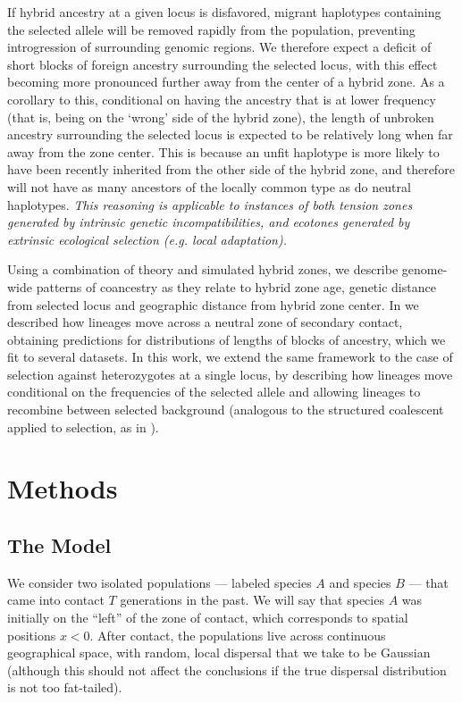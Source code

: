 \documentclass[11pt,letterpaper]{article}
\newcommand{\alisa}[1]{{\em \color{red} #1}}
\newcommand{\plr}[1]{{\em \color{blue} #1}}
\begin{document}
If hybrid ancestry at a given locus is disfavored, migrant haplotypes containing the selected allele will be removed rapidly from the population, preventing introgression of surrounding genomic regions. We therefore expect a deficit of short blocks of foreign ancestry surrounding the selected locus, with this effect becoming more pronounced further away from the center of a hybrid zone. As a corollary to this, conditional on having the ancestry that is at lower frequency (that is, being on the `wrong' side of the hybrid zone), the length of unbroken ancestry surrounding the selected locus is expected to be relatively long when far away from the zone center.  This is because an unfit haplotype is more likely to have been recently inherited from the other side of the hybrid zone, and therefore will not have
as many ancestors of the locally common type as do neutral haplotypes. \alisa{This reasoning is applicable to instances of both tension zones generated by intrinsic genetic incompatibilities, and ecotones generated by extrinsic ecological selection (e.g. local adaptation).}

Using a combination of theory and simulated hybrid zones, we describe genome-wide patterns of coancestry 
as they relate to hybrid zone age, genetic distance from selected locus and geographic distance from hybrid zone center. 
In \citet{sedghifar2015spatial} we described how lineages move across a neutral zone of secondary contact,
obtaining predictions for distributions of lengths of blocks of ancestry, which we fit to several datasets.
In this work, we extend the same framework to the case of selection against heterozygotes at a single locus,
by describing how lineages move conditional on the frequencies of the selected allele
and allowing lineages to recombine between selected background 
(analogous to the structured coalescent applied to selection, as in \citet{hudson1988coalescent}).



\section*{Methods}

\subsection*{The Model}

We consider two isolated populations
--- labeled species $A$ and species $B$ ---   %
that came into contact $T$ generations in the past.  
We will say that species $A$ was initially on the ``left'' of the zone of contact, which corresponds to spatial positions $x<0$.  
After contact, the populations live across continuous geographical space,
with random, local dispersal that we take to be Gaussian
(although this should not affect the conclusions if the true dispersal distribution is not too fat-tailed).
\end{document}
